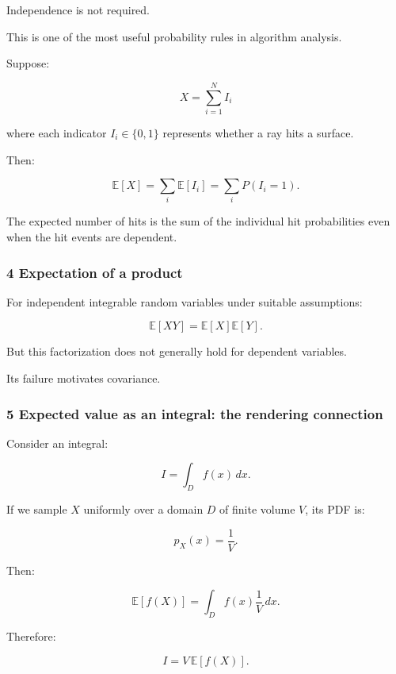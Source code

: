 Independence is not required.

This is one of the most useful probability rules in algorithm analysis.

Suppose:

\[
 X=\sum_{i=1}^NI_i
\]

where each indicator \(I_i\in\{0,1\}\) represents whether a ray hits a surface.

Then:

\[
 \mathbb E[X] = \sum_i\mathbb E[I_i] = \sum_iP(I_i=1).
\]

The expected number of hits is the sum of the individual hit probabilities even when the hit events are dependent.

\subsubsection{4 Expectation of a product}\label{02-foundations-ii-ch023-expectation-of-a-product}

\hypertarget{02-foundations-ii-ch023-expectation-of-a-product}{}

For independent integrable random variables under suitable assumptions:

\[
 \boxed{ \mathbb E[XY]=\mathbb E[X]\mathbb E[Y] }.
\]

But this factorization does not generally hold for dependent variables.

Its failure motivates covariance.

\subsubsection{5 Expected value as an integral: the rendering connection}\label{02-foundations-ii-ch023-expected-value-as-an-integral-the-rendering-connection}

\hypertarget{02-foundations-ii-ch023-expected-value-as-an-integral-the-rendering-connection}{}

Consider an integral:

\[
 I=\int_Df(x)\,dx.
\]

If we sample \(X\) uniformly over a domain \(D\) of finite volume \(V\), its PDF is:

\[
 p_X(x)=\frac1V.
\]

Then:

\[
 \mathbb E[f(X)] = \int_Df(x)\frac1V\,dx.
\]

Therefore:

\[
 \boxed{ I=V\,\mathbb E[f(X)] }.
\]

